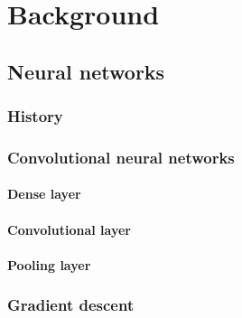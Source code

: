 \chapter{Background}


\section{Neural networks}


\subsection{History}


\subsection{Convolutional neural networks}


\subsubsection{Dense layer}

\subsubsection{Convolutional layer}

\subsubsection{Pooling layer}


\subsection{Gradient descent}

